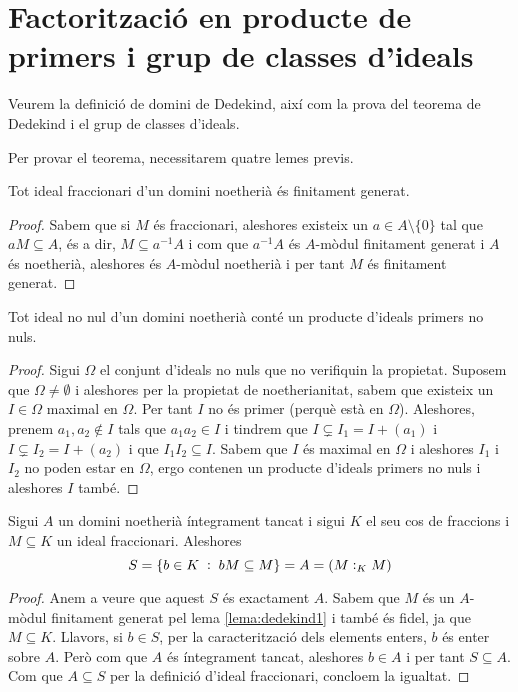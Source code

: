 \documentclass[../../../main.tex]{subfiles}
\begin{document}
\section{Factorització en producte de primers i grup de classes d'ideals}


Veurem la definició de domini de Dedekind, així com la prova del teorema de Dedekind i el grup de classes d'ideals.

Per provar el teorema, necessitarem quatre lemes previs.


\begin{lema}
\label{lema:dedekind1} Tot ideal fraccionari d'un domini noetherià és finitament generat.
\end{lema}
\begin{proof}
Sabem que si $M$ és fraccionari, aleshores existeix un $a\in A\setminus\{0\}$ tal que $aM\subseteq A$, és a dir, $M\subseteq a^{-1}A$ i com que $a^{-1}A$ és $A$-mòdul finitament generat i $A$ és noetherià, aleshores és $A$-mòdul noetherià i per tant $M$ és finitament generat.
\end{proof}

\begin{lema}
\label{lema:dedekind2} Tot ideal no nul d'un domini noetherià conté un producte d'ideals primers no nuls.
\end{lema}
\begin{proof}
Sigui $\Omega$ el conjunt d'ideals no nuls que no verifiquin la propietat. Suposem que $\Omega\neq\emptyset$ i aleshores per la propietat de noetherianitat, sabem que existeix un $I\in \Omega$ maximal en $\Omega$. Per tant $I$ no és primer (perquè està en $\Omega$). Aleshores, prenem $a_1,a_2\not\in I$ tals que $a_1a_2\in I$ i tindrem que $I\varsubsetneq I_1 = I+(a_1)$ i $I\varsubsetneq I_2 = I+(a_2)$ i que $I_1I_2\subseteq I$. Sabem que $I$ és maximal en $\Omega$ i aleshores $I_1$ i $I_2$ no poden estar en $\Omega$, ergo contenen un producte d'ideals primers no nuls i aleshores $I$ també.
\end{proof}


\begin{lema}
\label{lema:dedekind3} Sigui $A$ un domini noetherià íntegrament tancat i sigui $K$ el seu cos de fraccions i $M\subseteq K$ un ideal fraccionari. Aleshores
\begin{equation}
    \notag
    S = \{b\in K\;:\;bM\subseteq M\} = A = (M:_KM)
\end{equation}
\end{lema}
\begin{proof}
Anem a veure que aquest $S$ és exactament $A$. Sabem que $M$ és un $A$-mòdul finitament generat pel lema \ref{lema:dedekind1} i també és fidel, ja que $M\subseteq K$. Llavors, si $b\in S$, per la caracterització dels elements enters, $b$ és enter sobre $A$. Però com que $A$ és íntegrament tancat, aleshores $b\in A$ i per tant $S\subseteq A$. Com que $A\subseteq S$ per la definició d'ideal fraccionari, concloem la igualtat.
\end{proof}
\end{document}
